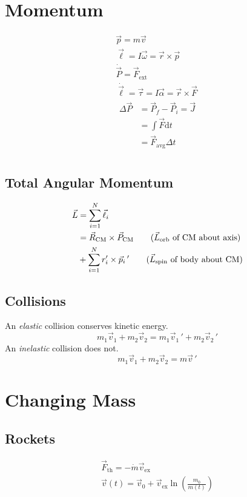 \documentclass{cheatsheet}
\begin{document}
	\section{Momentum}
	\begin{gather*}
		\vec p = m\vec v	\tag{momentum}\\
		\vec\ell = I\vec\omega = \vec r \times \vec p	\tag{rot. form}\\
		\dot{\vec P} = \vec F_\mathrm{ext} \tag{3rd law}\\
		\dot{\vec\ell} = \vec\tau = I\vec\alpha= \vec r \times \vec F	\tag{rot. form}\\
		\begin{split}
				\Delta\vec P &= \vec P_f - \vec P_i = \vec J	\\
			&= \int \vec F \mathrm{d}t	\\
			&= \vec F_\text{avg}\Delta t
		\end{split}\tag{impulse}\\
	\end{gather*}
		\subsection{Total Angular Momentum}
		\begin{align*}
			\vec L &= \sum_{i=1}^{N} \vec\ell_i	\\
			&= \vec R_\text{CM} \times \vec P_\text{CM}	\tag{$\vec L_\text{orb}$ of CM about axis}\\
			&+ \sum_{i=1}^{N} r_i' \times \vec p_i\,'		\tag{$\vec L_\text{spin}$ of body about CM}
		\end{align*}
		\subsection{Collisions}
			An \emph{elastic} collision conserves kinetic energy.
			\[
				m_1\vec v_1 + m_2\vec v_2 = m_1\vec v_1\,' + m_2\vec v_2\,'
			\]
			An \emph{inelastic} collision does not.
			\[
				m_1\vec v_1 + m_2\vec v_2 = m\vec v\,'
			\]
	\section{Changing Mass}
		\subsection{Rockets}
			\begin{gather*}
				\vec F_\mathrm{th} = -\dot{m}\vec v_\mathrm{ex}		\tag{thrust}\\
				\vec v(t) = \vec v_0 + \vec v_\mathrm{ex}\ln\left( \frac{m_0}{m(t)} \right)	\tag{$\Delta V$}
			\end{gather*}
\end{document}
